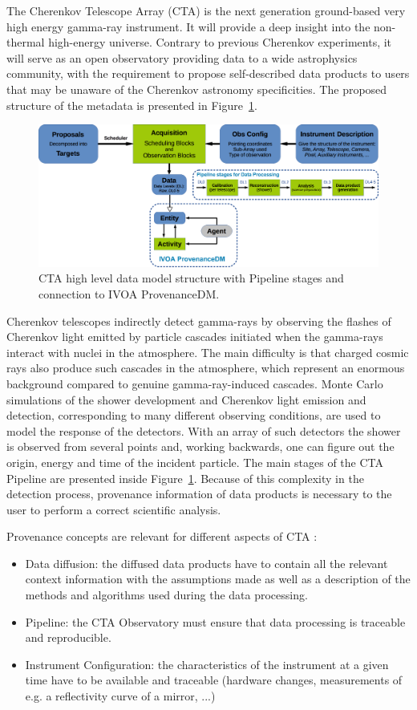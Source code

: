 The Cherenkov Telescope Array (CTA) is the next generation ground-based very high energy gamma-ray instrument. It will provide a deep insight into the non-thermal high-energy universe. Contrary to previous Cherenkov experiments, it will serve as an open observatory providing data to a wide astrophysics community, with the requirement to propose self-described data products to users that may be unaware of the Cherenkov astronomy specificities. The proposed structure of the metadata is presented in Figure~\ref{fig:cta_dm}.

\begin{figure}
\centering
\includegraphics[width=\textwidth]{CTA_DM_high_level.png}
\caption{CTA high level data model structure with Pipeline stages and connection to IVOA ProvenanceDM.}
\label{fig:cta_dm}
\end{figure}

Cherenkov telescopes indirectly detect gamma-rays by observing the flashes of Cherenkov light emitted by particle cascades initiated when the gamma-rays interact with nuclei in the atmosphere. The main difficulty  is that charged cosmic rays also produce such cascades in the atmosphere, which represent an enormous background compared to genuine gamma-ray-induced cascades. Monte Carlo simulations of the shower development and Cherenkov light emission and detection, corresponding to many different observing conditions, are used to model the response of the detectors.  With an array of such detectors the shower is observed  from several points and, working backwards, one can figure out the origin, energy and time of the incident particle. The main stages of the CTA Pipeline are presented inside Figure~\ref{fig:cta_dm}. Because of this complexity in the detection process, provenance information of data products is necessary to the user to perform a correct scientific analysis.

Provenance concepts are relevant for different aspects of CTA :
\begin{itemize}
\item Data diffusion: the diffused data products have to contain all the relevant context information with the assumptions made as well as a description of the methods and algorithms used during the data processing.
\item Pipeline: the CTA Observatory must ensure that data processing is traceable and reproducible.
\item Instrument Configuration: the characteristics of the instrument at a given time have to be available and traceable (hardware changes, measurements of e.g. a reflectivity curve of a mirror, ...)
\end{itemize}

